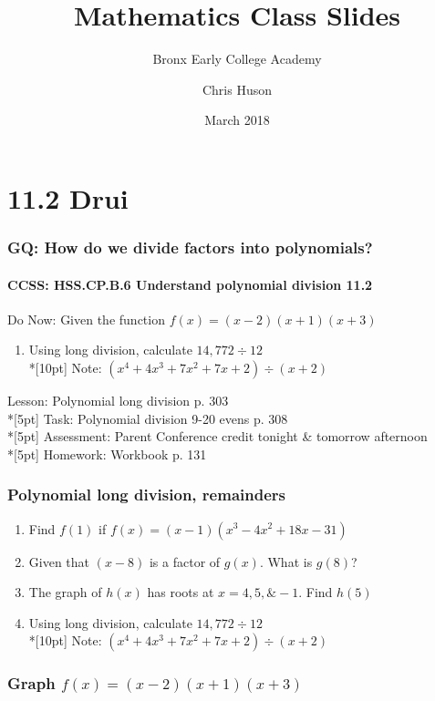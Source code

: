 \documentclass{beamer}
\title{Mathematics Class Slides}
\subtitle{Bronx Early College Academy}
\author{Chris Huson}
\date{March 2018}
\begin{document}
\frame{\titlepage}


\section{11.2 Drui}
\frame
{
  \frametitle{GQ: How do we divide factors into polynomials?}
  \framesubtitle{CCSS: HSS.CP.B.6 Understand polynomial division \qquad \qquad \qquad \alert{11.2}}

  \begin{block}{Do Now: Given the function $f(x)=(x-2)(x+1)(x+3)$}
    \begin{enumerate}
    \item Using long division, calculate $14,772 \div 12$\\*[10pt] 
    Note: $(x^4+4x^3+7x^2+7x+2) \div (x+2)$
    \end{enumerate}
  \end{block}
  Lesson: Polynomial long division p. 303\\*[5pt]
  Task: Polynomial division 9-20 evens p. 308\\*[5pt]
  Assessment: Parent Conference \alert{credit} tonight & tomorrow afternoon\\*[5pt]
  Homework: Workbook p. 131
}

\frame
{
  \frametitle{Polynomial long division, remainders }
\begin{enumerate}
    \item Find $f(1)$ if $f(x)=(x-1)(x^3-4x^2+18x-31)$
    \item Given that $(x-8)$ is a factor of $g(x)$. What is $g(8)$?
    \item The graph of $h(x)$ has roots at $x=4, 5, \& -1$. Find $h(5)$
    \item Using long division, calculate $14,772 \div 12$\\*[10pt] 
    Note: $(x^4+4x^3+7x^2+7x+2) \div (x+2)$
\end{enumerate}

}

\frame
{
  \frametitle{Graph $f(x)=(x-2)(x+1)(x+3)$}
  
}
\end{document}
